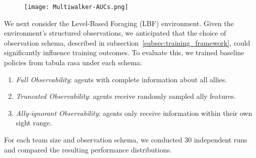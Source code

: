 \documentclass{article}
\begin{document}
\begin{figure}[!h]
    \centering
    \texttt{[image: Multiwalker-AUCs.png]}
    \caption{}
    \label{fig:multiwalker-aucs}
\end{figure}

We next consider the Level-Based Foraging (LBF) environment.
Given the environment's structured observations, we anticipated that the
choice of observation schema, described in subsection~\ref{subsec:training_framework},
could significantly influence training outcomes.
To evaluate this, we trained baseline policies from tabula rasa under each schema:
\begin{enumerate}
\item \emph{Full Observability}: agents with complete information about all allies.
\item \emph{Truncated Observability}: agents receive randomly sampled ally features.
\item \emph{Ally-ignorant Observability}: agents only receive information within their own sight range.
\end{enumerate}
For each team size and observation schema, we conducted 30 independent runs
and compared the resulting performance distributions.
\end{document}
